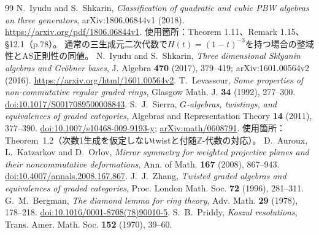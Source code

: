 \documentclass[11pt,a4paper]{ltjsarticle}
\theoremstyle{definition}
\newcommand{\ZZ}{\mathbb Z}
\begin{document}
\begin{thebibliography}{99}
N.~Iyudu and S.~Shkarin,
\emph{Classification of quadratic and cubic PBW algebras on three generators},
arXiv:1806.06844v1 (2018).
\url{https://arxiv.org/pdf/1806.06844v1}.
使用箇所：Theorem 1.11、Remark 1.15、\S12.1（p.78）。
通常の三生成元二次代数で$H(t)=(1-t)^{-3}$を持つ場合の整域性とAS正則性の同値。
N.~Iyudu and S.~Shkarin,
\emph{Three dimensional Sklyanin algebras and Gr\"obner bases},
J. Algebra \textbf{470} (2017), 379--419;
arXiv:1601.00564v2 (2016).
\url{https://arxiv.org/html/1601.00564v2}.
T.~Levasseur,
\emph{Some properties of non-commutative regular graded rings},
Glasgow Math. J. \textbf{34} (1992), 277--300.
\href{https://doi.org/10.1017/S0017089500008843}{doi:10.1017/S0017089500008843}.
S.~J.~Sierra,
\emph{$G$-algebras, twistings, and equivalences of graded categories},
Algebras and Representation Theory \textbf{14} (2011), 377--390.
\href{https://doi.org/10.1007/s10468-009-9193-y}{doi:10.1007/s10468-009-9193-y};
\href{https://arxiv.org/abs/math/0608791}{arXiv:math/0608791}.
使用箇所：Theorem~1.2（次数1生成を仮定しないtwistと付随$\ZZ$-代数の対応）。
D.~Auroux, L.~Katzarkov and D.~Orlov,
\emph{Mirror symmetry for weighted projective planes and their noncommutative deformations},
Ann. of Math. \textbf{167} (2008), 867--943.
\href{https://doi.org/10.4007/annals.2008.167.867}{doi:10.4007/annals.2008.167.867}.
J.~J.~Zhang, \emph{Twisted graded algebras and equivalences of graded categories},
Proc. London Math. Soc. \textbf{72} (1996), 281--311.
G.~M.~Bergman, \emph{The diamond lemma for ring theory},
Adv. Math. \textbf{29} (1978), 178--218.
\href{https://doi.org/10.1016/0001-8708(78)90010-5}{doi:10.1016/0001-8708(78)90010-5}.
S.~B.~Priddy, \emph{Koszul resolutions},
Trans. Amer. Math. Soc. \textbf{152} (1970), 39--60.
\end{thebibliography}
\endgroup
\end{document}
